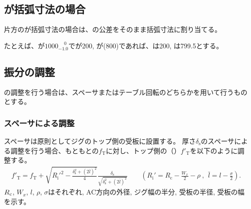 \subsection{\AlocationLength が括弧寸法の場合}
片方の\AlocationLength が括弧寸法の場合は、\WorkTotalLength の公差をそのまま括弧寸法に割り当てる。
\begin{hosoku}
たとえば、\WorkTotalLength が$1000^{\phantom +0}_{-1.0}$で\TopAlocationLength が200, \BottomAlocationLength が(800)であれば、\TopAlocationLength は200, \BottomAlocationLength は799.5とする。
\end{hosoku}


\subsection{振分の調整}
\AlocationLength の調整を行う場合は、スペーサまたはテーブル回転のどちらかを用いて行うものとする。

\subsubsection{スペーサによる調整}
スペーサは原則としてジグのトップ側の受板に設置する。
厚さ$\delta_\mathrm s$のスペーサによる調整を行う場合、もともとの\TopAlocationLength$f_\mathrm T$に対し、トップ側の\AlocationLength（\TopReAlocationLength）$f'_\mathrm T$を以下のように調整する。
\begin{align*}
  f'_\mathrm T
  = f_\mathrm T
    +\sqrt{R_\mathrm i'^2-\frac{\delta_\mathrm s^2+(2\bar l)^2}4}\frac{\delta_\mathrm s}{\sqrt{\delta_\mathrm s^2+(2\bar l)^2}}\qquad
    \left(R_\mathrm i' = R_\mathrm c-\frac{W_x}2-\rho~,~~\bar l = l-\frac\sigma2\right).
\end{align*}
$R_\textrm c$, $W_x$, $l$, $\rho$, $\sigma$はそれぞれ\CenterCurvatureRadius, AC方向の外径, ジグ幅の半分, 受板の半径, 受板の幅を示す。


